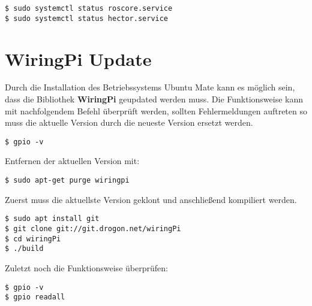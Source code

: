 \begin{lstlisting}
$ sudo systemctl status roscore.service
$ sudo systemctl status hector.service
\end{lstlisting}
\vspace{-1.1cm}









\section{WiringPi Update}

Durch die Installation des Betriebssystems Ubuntu Mate kann es möglich sein, dass die Bibliothek \textbf{WiringPi} geupdated werden muss. Die Funktionsweise kann mit nachfolgendem Befehl überprüft werden, sollten Fehlermeldungen auftreten so muss die aktuelle Version durch die neueste Version ersetzt werden.\\

\begin{lstlisting}
$ gpio -v
\end{lstlisting}
\vspace{-0.8cm}

Entfernen der aktuellen Version mit:\\

\begin{lstlisting}
$ sudo apt-get purge wiringpi
\end{lstlisting}
\vspace{-0.8cm}

Zuerst muss die aktuellste Version geklont und anschließend kompiliert werden.\\

\begin{lstlisting}
$ sudo apt install git
$ git clone git://git.drogon.net/wiringPi
$ cd wiringPi
$ ./build
\end{lstlisting}
\vspace{-0.8cm}

Zuletzt noch die Funktionsweise überprüfen:\\

\begin{lstlisting}
$ gpio -v 
$ gpio readall
\end{lstlisting}
